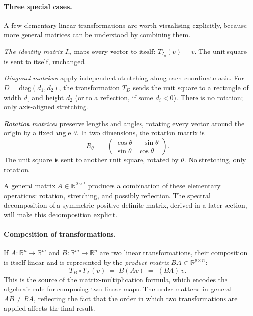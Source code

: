\documentclass[11pt, a4paper, oneside]{article}
\begin{document}
\paragraph{Three special cases.}
A few elementary linear transformations are worth visualising
explicitly, because more general matrices can be understood by
combining them.

\emph{The identity matrix $I_n$} maps every vector to itself:
$T_{I_n}(v) = v$. The unit square is sent to itself, unchanged.

\emph{Diagonal matrices} apply independent stretching along each
coordinate axis. For $D = \mathrm{diag}(d_1, d_2)$, the
transformation $T_D$ sends the unit square to a rectangle of width
$d_1$ and height $d_2$ (or to a reflection, if some $d_i < 0$).
There is no rotation; only axis-aligned stretching.

\emph{Rotation matrices} preserve lengths and angles, rotating every
vector around the origin by a fixed angle $\theta$. In two
dimensions, the rotation matrix is
\[
R_\theta \;=\; \begin{pmatrix} \cos\theta & -\sin\theta \\ \sin\theta & \cos\theta \end{pmatrix}.
\]
The unit square is sent to another unit square, rotated by $\theta$.
No stretching, only rotation.

A general matrix $A \in \mathbb{R}^{2 \times 2}$ produces a
combination of these elementary operations: rotation, stretching, and
possibly reflection. The spectral decomposition of a symmetric
positive-definite matrix, derived in a later section, will make this
decomposition explicit.

\paragraph{Composition of transformations.}
If $A: \mathbb{R}^n \to \mathbb{R}^m$ and $B: \mathbb{R}^m \to \mathbb{R}^p$
are two linear transformations, their composition is itself linear
and is represented by the \emph{product matrix} $BA \in \mathbb{R}^{p \times n}$:
\[
T_B \circ T_A (v) \;=\; B (A v) \;=\; (BA)\, v.
\]
This is the source of the matrix-multiplication formula, which
encodes the algebraic rule for composing two linear maps. The order
matters: in general $AB \neq BA$, reflecting the fact that the order
in which two transformations are applied affects the final result.
\end{document}
